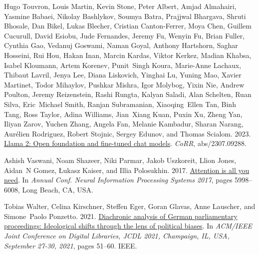 \documentclass[11pt,a4paper]{article}
\begin{document}
\begin{thebibliography}{26}
  Hugo Touvron, Louis Martin, Kevin Stone, Peter Albert, Amjad Almahairi, Yasmine
    Babaei, Nikolay Bashlykov, Soumya Batra, Prajjwal Bhargava, Shruti Bhosale,
    Dan Bikel, Lukas Blecher, Cristian Canton{-}Ferrer, Moya Chen, Guillem
    Cucurull, David Esiobu, Jude Fernandes, Jeremy Fu, Wenyin Fu, Brian Fuller,
    Cynthia Gao, Vedanuj Goswami, Naman Goyal, Anthony Hartshorn, Saghar
    Hosseini, Rui Hou, Hakan Inan, Marcin Kardas, Viktor Kerkez, Madian Khabsa,
    Isabel Kloumann, Artem Korenev, Punit~Singh Koura, Marie{-}Anne Lachaux,
    Thibaut Lavril, Jenya Lee, Diana Liskovich, Yinghai Lu, Yuning Mao, Xavier
    Martinet, Todor Mihaylov, Pushkar Mishra, Igor Molybog, Yixin Nie, Andrew
    Poulton, Jeremy Reizenstein, Rashi Rungta, Kalyan Saladi, Alan Schelten, Ruan
    Silva, Eric~Michael Smith, Ranjan Subramanian, Xiaoqing~Ellen Tan, Binh Tang,
    Ross Taylor, Adina Williams, Jian~Xiang Kuan, Puxin Xu, Zheng Yan, Iliyan
    Zarov, Yuchen Zhang, Angela Fan, Melanie Kambadur, Sharan Narang,
    Aur{\'{e}}lien Rodriguez, Robert Stojnic, Sergey Edunov, and Thomas Scialom.
    2023{}.
  \newblock \href {https://doi.org/10.48550/arXiv.2307.09288} {Llama 2: Open
    foundation and fine-tuned chat models}.
  \newblock \emph{CoRR}, abs/2307.09288.
  
  Ashish Vaswani, Noam Shazeer, Niki Parmar, Jakob Uszkoreit, Llion Jones,
    Aidan~N Gomez, {\L}ukasz Kaiser, and Illia Polosukhin. 2017.
  \newblock \href {http://arxiv.org/abs/1706.03762} {Attention is all you need}.
  \newblock In \emph{Annual Conf. Neural Information Processing Systems 2017},
    pages 5998--6008, Long Beach, CA, USA.
  
  Tobias Walter, Celina Kirschner, Steffen Eger, Goran Glavas, Anne Lauscher, and
    Simone~Paolo Ponzetto. 2021.
  \newblock \href {https://doi.org/10.1109/JCDL52503.2021.00017} {Diachronic
    analysis of {G}erman parliamentary proceedings: {I}deological shifts through
    the lens of political biases}.
  \newblock In \emph{{ACM/IEEE} Joint Conference on Digital Libraries, {JCDL}
    2021, Champaign, IL, USA, September 27-30, 2021}, pages 51--60. {IEEE}.
  

\end{thebibliography}
\end{document}
